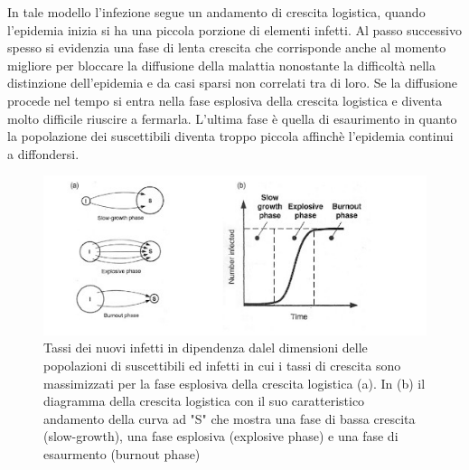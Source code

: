 \documentclass[11pt]{article}
\begin{document}
In tale modello l'infezione segue un andamento di crescita logistica, quando l'epidemia inizia si ha una piccola porzione di elementi infetti. Al passo successivo spesso si evidenzia una fase di lenta crescita che corrisponde anche al momento migliore per bloccare la diffusione della malattia nonostante la difficoltà nella distinzione dell'epidemia e da casi sparsi non correlati tra di loro. Se la diffusione procede nel tempo si entra nella fase esplosiva della crescita logistica e diventa molto difficile riuscire a fermarla. L'ultima fase è quella di esaurimento in quanto la popolazione dei suscettibili diventa troppo piccola affinchè l'epidemia continui a diffondersi.

\begin{figure}[H]
    \includegraphics[width=16cm]{resources/tasso_sir_2.jpeg}
    \caption{Tassi dei nuovi infetti in dipendenza dalel dimensioni delle popolazioni di suscettibili ed infetti in cui i tassi di crescita sono massimizzati per la fase esplosiva della crescita logistica (a). In (b) il diagramma della crescita logistica con il suo caratteristico andamento della curva ad "S" che mostra una fase di bassa crescita (slow-growth), una fase esplosiva (explosive phase) e una fase di esaurmento (burnout phase)} 
\end{figure}
\end{document}
